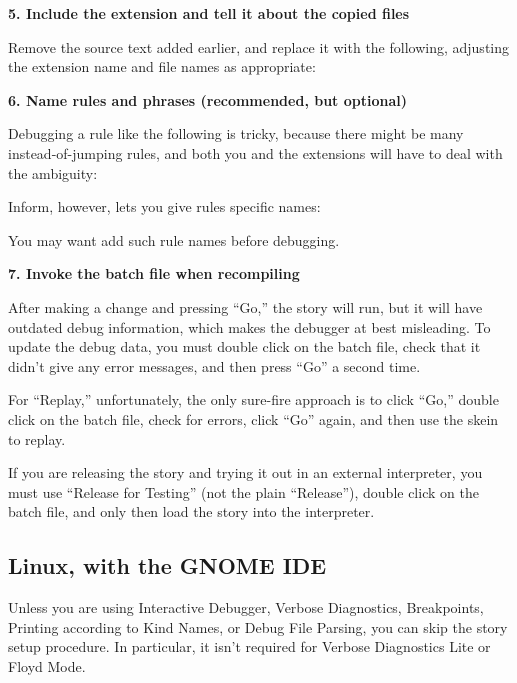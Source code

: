 \documentclass{book}
\newcommand{\lastpagebreak}{\vfill\pagebreak}
\begin{document}
\textbf{5. Include the extension and tell it about the copied files}

Remove the source text added earlier, and replace it with the following,
adjusting the extension name and file names as appropriate:

\begin{quote}
  
\end{quote}

\textbf{6. Name rules and phrases (recommended, but optional)}

Debugging a rule like the following is tricky, because there might be many
instead-of-jumping rules, and both you and the extensions will have to deal with
the ambiguity:

\begin{quote}
  
\end{quote}

Inform, however, lets you give rules specific names:

\begin{quote}
  
\end{quote}

You may want add such rule names before debugging.

\textbf{7. Invoke the batch file when recompiling}

After making a change and pressing ``Go,'' the story will run, but it will have
outdated debug information, which makes the debugger at best misleading.  To
update the debug data, you must double click on the batch file, check that it
didn't give any error messages, and then press ``Go'' a second time.

For ``Replay,'' unfortunately, the only sure-fire approach is to click ``Go,''
double click on the batch file, check for errors, click ``Go'' again, and then
use the skein to replay.

If you are releasing the story and trying it out in an external interpreter, you
must use ``Release for Testing'' (not the plain ``Release''), double click on
the batch file, and only then load the story into the interpreter.

\lastpagebreak

\subsection{Linux, with the GNOME IDE}

Unless you are using Interactive Debugger, Verbose Diagnostics, Breakpoints,
Printing according to Kind Names, or Debug File Parsing, you can skip the story
setup procedure.  In particular, it isn't required for Verbose Diagnostics Lite
or Floyd Mode.
\end{document}

